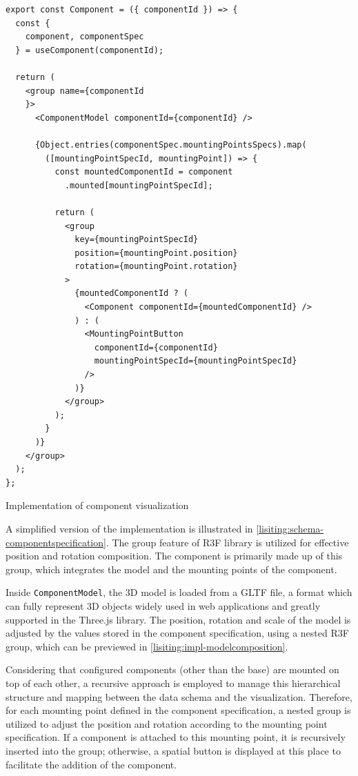 \begin{listing}[h!]
\begin{verbatim}
export const Component = ({ componentId }) => {
  const { 
    component, componentSpec
  } = useComponent(componentId);

  return (
    <group name={componentId
    }>
      <ComponentModel componentId={componentId} />

      {Object.entries(componentSpec.mountingPointsSpecs).map(
        ([mountingPointSpecId, mountingPoint]) => {
          const mountedComponentId = component
            .mounted[mountingPointSpecId];

          return (
            <group
              key={mountingPointSpecId}
              position={mountingPoint.position}
              rotation={mountingPoint.rotation}
            >
              {mountedComponentId ? (
                <Component componentId={mountedComponentId} />
              ) : (
                <MountingPointButton
                  componentId={componentId}
                  mountingPointSpecId={mountingPointSpecId}
                />
              )}
            </group>
          );
        }
      )}
    </group>
  );
};
\end{verbatim}
\caption{Implementation of component visualization}
\label{lisiting:impl-visulaization1}
\end{listing}

A simplified version of the implementation is illustrated in \autoref{lisiting:schema-componentspecification}. The group feature of R3F library is utilized for effective position and rotation composition. The component is primarily made up of this group, which integrates the model and the mounting points of the component.

Inside \texttt{ComponentModel}, the 3D model is loaded from a GLTF file, a format which can fully represent 3D objects widely used in web applications and greatly supported in the Three.js library. The position, rotation and scale of the model is adjusted by the values stored in the component specification, using a nested R3F group, which can be previewed in \autoref{lisiting:impl-modelcomposition}.

Considering that configured components (other than the base) are mounted on top of each other, a recursive approach is employed to manage this hierarchical structure and mapping between the data schema and the visualization. Therefore, for each mounting point defined in the component specification, a nested group is utilized to adjust the position and rotation according to the mounting point specification. If a component is attached to this mounting point, it is recursively inserted into the group; otherwise, a spatial button is displayed at this place to facilitate the addition of the component. 

